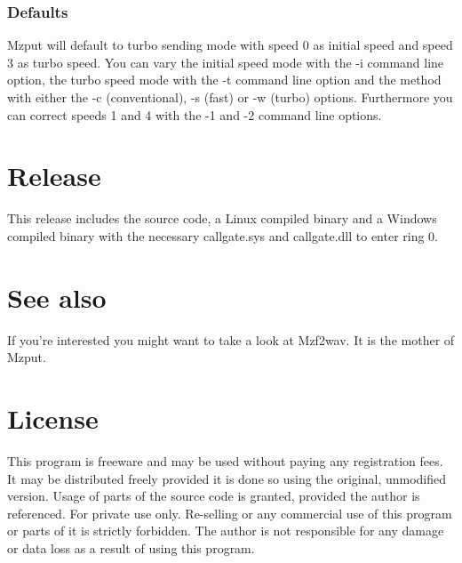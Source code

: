 \subsubsection{Defaults}
Mzput will default to turbo sending mode with speed 0 as initial speed and
speed 3 as turbo speed. You can vary the initial speed mode with the -i 
command line option, the turbo speed mode with the -t command line option and
the method with either the -c (conventional), -s (fast) or -w (turbo) options.
Furthermore you can correct speeds 1 and 4 with the -1 and -2 command line
options.

\section{Release}
This release includes the source code, a Linux compiled binary and a Windows 
compiled binary with the necessary callgate.sys and callgate.dll to enter
ring 0.

\section{See also}
If you're interested you might want to take a look at Mzf2wav. It is the mother
of Mzput.

\section{License}
This program is freeware and may be used without paying any registration fees.
It may be distributed freely provided it is done so using the original, 
unmodified version. Usage of parts of the source code is granted, provided the 
author is referenced. For private use only. Re-selling or any commercial use of
this program or parts of it is strictly forbidden. The author is not 
responsible for any damage or data loss as a result of using this program.


